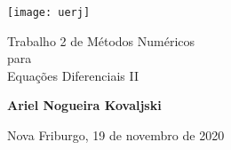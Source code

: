 \begin{titlepage}
    \begin{center}
        \vspace*{1cm}

        \texttt{[image: uerj]}

        {\Huge
           Trabalho 2 de Métodos Numéricos \\
           para \\
           Equações Diferenciais II \par
        }

        \vspace{1.5cm}

        \textbf{Ariel Nogueira Kovaljski}

        \vspace{0.5cm}

        Nova Friburgo, 19 de novembro de 2020
        \vfill

    \end{center}
\end{titlepage}